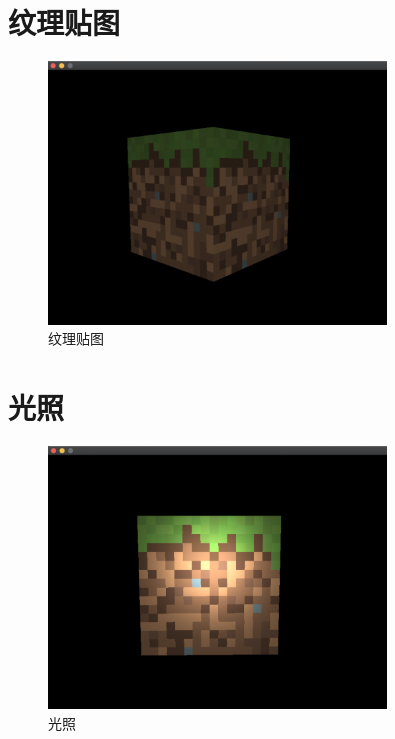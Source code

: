     \section{纹理贴图}
        \begin{figure}[H]
    	\centering
		\includegraphics[width=0.8\textwidth]{images/demo6.png}
		\caption{纹理贴图}
		\label{demo6}
    \end{figure} 
    
    \section{光照}
        \begin{figure}[H]
    	\centering
		\includegraphics[width=0.8\textwidth]{images/demo7.png}
		\caption{光照}
		\label{demo7}
    \end{figure} 
    
